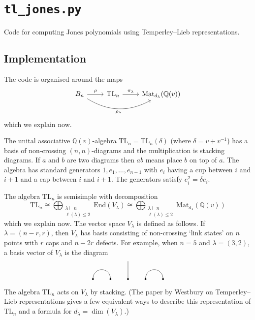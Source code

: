﻿\documentclass[10pt]{article}
\title{}
\author{}
\date{}
\newcommand{\End}{\mathrm{End}}
\newcommand{\TL}{\mathrm{TL}}
\begin{document}
\section*{\texttt{tl\_jones.py}}
Code for computing Jones polynomials using Temperley--Lieb representations.

\subsection*{Implementation}
The code is organised around the maps
\[
\begin{tikzcd}
B_n
  \arrow[r, "\rho"]
  \arrow[rr, bend right=30, "\rho_\lambda"']
&
\TL_n
  \arrow[r, "\pi_\lambda"]
&
\mathrm{Mat}_{d_\lambda}(\mathbb{Q}(v))
\end{tikzcd}
\]
which we explain now. 

The unital associative $\mathbb{Q}(v)$-algebra \(\TL_n=\TL_n(\delta)\) (where $\delta=v+v^{-1}$) 
has a basis of non-crossing \((n,n)\)-diagrams and the multiplication is stacking diagrams. 
If $a$ and $b$ are two diagrams then $ab$ means place $b$ on top of $a$. 
The algebra has standard generators $1,e_1,\ldots,e_{n-1}$ with $e_i$ having a 
cup between $i$ and $i+1$ and a cap between $i$ and $i+1$. 
The generators satisfy $e_i^2 = \delta e_i$.

The algebra $\TL_n$ is semisimple with decomposition
\[
\TL_n 
\cong \bigoplus_{\substack{\lambda \vdash n \\ \ell(\lambda)\le 2}} 
\End(V_\lambda)
\cong \bigoplus_{\substack{\lambda \vdash n \\ \ell(\lambda)\le 2}} 
\mathrm{Mat}_{d_\lambda}(\mathbb{Q}(v))
\]
which we explain now. The vector space $V_\lambda$ is defined as follows. 
If \(\lambda=(n-r,r)\), then $V_\lambda$ has basis consisting of
non-crossing `link states' on \(n\) points with \(r\) caps and
\(n-2r\) defects. For example, when \(n=5\) and \(\lambda=(3,2)\),
a basis vector of $V_\lambda$ is the diagram
\[
\begin{tikzpicture}[scale=0.9, baseline=-0.2ex]
  \foreach \x in {0,1,2,3,4} {
    \fill (\x,0) circle (1.5pt);
  }
  \draw (0,0) .. controls (0,0.7) and (1,0.7) .. (1,0);
  \draw (3,0) .. controls (3,0.7) and (4,0.7) .. (4,0);
  \draw (2,0) -- (2,1);
\end{tikzpicture}
\]
The algebra $\TL_n$ acts on $V_\lambda$ by stacking. (The paper by Westbury on Temperley--Lieb representations gives a few equivalent ways to describe this representation of $\TL_n$ and a formula for $d_\lambda = \dim(V_\lambda)$.)
\end{document}
